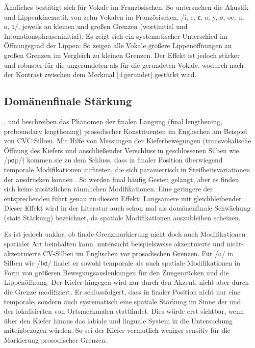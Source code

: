 Ähnliches bestätigt sich für Vokale im Französischen. So untersuchen \citet{Georgeton2014} die Akustik und Lippenkinematik von zehn Vokalen im Französischen, /i, e, ɛ, a, y, ø, oe, u, o, ɔ/, jeweils an kleinen und großen Grenzen (wortinitial und Intonationsphraseninitial). Es zeigt sich ein systematischer Unterschied im Öffnungsgrad der Lippen: So zeigen alle Vokale größere Lippenöffnungen an großen Grenzen im Vergleich zu kleinen Grenzen. Der Effekt ist jedoch stärker und robuster für die ungerundeten als für die gerundeten Vokale, wodurch nach \citet{Georgeton2014} der Kontrast zwischen dem Merkmal [±gerundet]  gestärkt wird.

\subsection{Domänenfinale Stärkung}
\label{subsec:050202}

\citet{Beckman1990}, \citet{Edwards1991} und \citet{Beckman1992} beschreiben das Phänomen der finalen Längung (final lengthening, preboundary lengthening) prosodischer Konstituenten im Englischen am Beispiel von CVC Silben. Mit Hilfe von Messungen der Kieferbewegungen (transvokalische Öffnung des Kiefers und anschließender Verschluss in geschlossenen Silben wie /pɑp/) kommen sie zu dem Schluss, dass in finaler Position überwiegend temporale Modifikationen auftreten, die sich parametrisch in Steifheitsvariationen der  ausdrücken können \citep[vgl. auch][]{Wightman1992}. So werden final häufig Gesten gelängt, aber es finden sich keine zusätzlichen räumlichen Modifikationen. Eine geringere  der entsprechenden  führt genau zu diesem Effekt: Langsamere  mit gleichbleibender . Dieser Effekt wird in der Literatur auch schon mal als domänenfinale Schwächung (statt Stärkung) bezeichnet, da spatiale Modifikationen auszubleiben scheinen.

Es ist jedoch unklar, ob finale Grenzmarkierung nicht doch auch Modifikationen spatialer Art beinhalten kann. \citet{Cho2005a} untersucht beispielsweise akzentuierte und nicht-akzentuierte CV-Silben im Englischen vor prosodischen Grenzen. Für /ɑ/ in Silben wie /bɑ/ findet er sowohl temporale als auch spatiale Modifikationen in Form von größeren Bewegungsauslenkungen für den Zungenrücken und die Lippenöffnung. Der Kiefer hingegen wird nur durch den Akzent, nicht aber durch die Grenze modifiziert. Er schlussfolgert, dass in finaler Position nicht nur eine temporale, sondern auch systematisch eine spatiale Stärkung im Sinne der  und der lokalisierten  von Ortsmerkmalen stattfindet. Dies würde erst sichtbar, wenn über den Kiefer hinaus das labiale und linguale System in die Untersuchung miteinbezogen würden. So sei der Kiefer vermutlich weniger sensitiv für die Markierung prosodischer Grenzen. 

